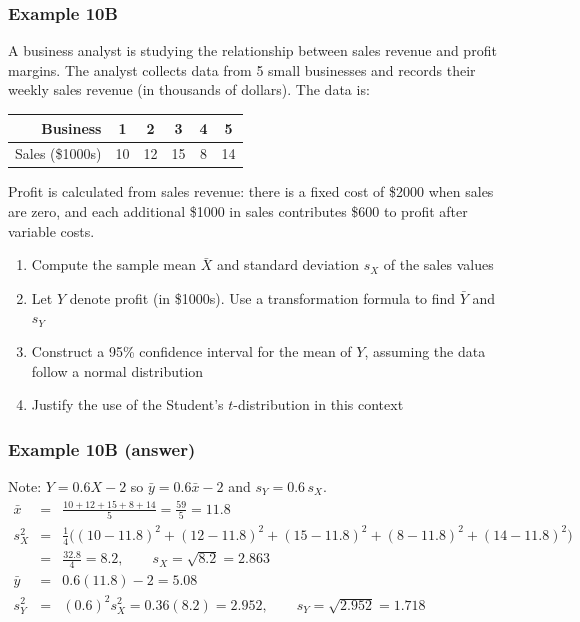\documentclass[t,8pt]{beamer}
\begin{document}
\begin{frame}
	\frametitle{Example 10B}
	A business analyst is studying the relationship between sales revenue and profit margins. The analyst collects data from 5 small businesses and records their weekly sales revenue (in thousands of dollars). The data is:
	\begin{table}[h]
		\centering
		\begin{tabular}{r|ccccc}
			\hline
			Business & 1 & 2 & 3 & 4 & 5 \\
			\hline
			Sales (\$1000s) & 10 & 12 & 15 & 8 & 14 \\
			\hline
		\end{tabular}
	\end{table}
	Profit is calculated from sales revenue: there is a fixed cost of \$2000 when sales are zero, and each additional \$1000 in sales contributes \$600 to profit after variable costs. \par
	\begin{enumerate}
		\item Compute the sample mean \( \bar{X} \) and standard deviation \( s_X \) of the sales values
		\item Let $Y$ denote profit (in \$1000s). Use a transformation formula to find \( \bar{Y} \) and \( s_Y \)
		\item Construct a 95\% confidence interval for the mean of \( Y \), assuming the data follow a normal distribution
		\item Justify the use of the Student’s $t$-distribution in this context
	\end{enumerate}
\end{frame}

\begin{frame}
	\frametitle{Example 10B (answer)}
	Note: \( Y = 0.6X - 2 \) so $\bar y=0.6\bar x-2$ and \( s_Y = 0.6\, s_X \).
	\begin{eqnarray*}
		\bar{x} &=& \frac{10 + 12 + 15 + 8 + 14}{5} = \frac{59}{5} = 11.8 \\[4pt]
		s_X^2 &=& \frac 14\Big((10 - 11.8)^2 + (12 - 11.8)^2 + (15 - 11.8)^2 + (8 - 11.8)^2 + (14 - 11.8)^2\Big) \\[4pt]
		&=& \frac{32.8}{4} = 8.2,\qquad
		s_X = \sqrt{8.2} = 2.863 \\[4pt]
		\bar{y} &=& 0.6(11.8) - 2 = 5.08 \\[4pt]
		s_Y^2 &=& (0.6)^2 s_X^2 = 0.36(8.2) = 2.952,\qquad
		s_Y = \sqrt{2.952} = 1.718
	\end{eqnarray*}
\end{frame}
\end{document}

